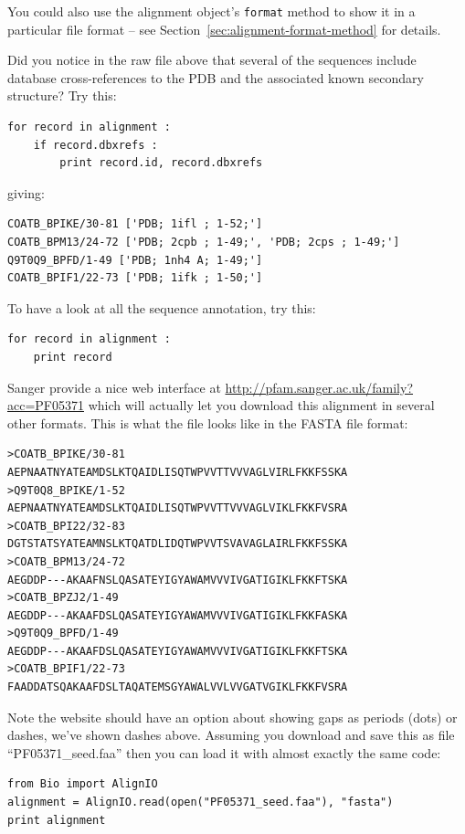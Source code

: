 \documentclass{report}
\begin{document}
You could also use the alignment object's \verb|format| method to show it in a particular file format  -- see Section~\ref{sec:alignment-format-method} for details.

Did you notice in the raw file above that several of the sequences include database cross-references to the PDB and the associated known secondary structure?  Try this:

\begin{verbatim}
for record in alignment :
    if record.dbxrefs :
        print record.id, record.dbxrefs
\end{verbatim}

\noindent giving:

\begin{verbatim}
COATB_BPIKE/30-81 ['PDB; 1ifl ; 1-52;']
COATB_BPM13/24-72 ['PDB; 2cpb ; 1-49;', 'PDB; 2cps ; 1-49;']
Q9T0Q9_BPFD/1-49 ['PDB; 1nh4 A; 1-49;']
COATB_BPIF1/22-73 ['PDB; 1ifk ; 1-50;']
\end{verbatim}

\noindent To have a look at all the sequence annotation, try this:

\begin{verbatim}
for record in alignment :
    print record
\end{verbatim}

Sanger provide a nice web interface at \url{http://pfam.sanger.ac.uk/family?acc=PF05371} which will actually let you download this alignment in several other formats.  This is what the file looks like in the FASTA file format:

\begin{verbatim}
>COATB_BPIKE/30-81
AEPNAATNYATEAMDSLKTQAIDLISQTWPVVTTVVVAGLVIRLFKKFSSKA
>Q9T0Q8_BPIKE/1-52
AEPNAATNYATEAMDSLKTQAIDLISQTWPVVTTVVVAGLVIKLFKKFVSRA
>COATB_BPI22/32-83
DGTSTATSYATEAMNSLKTQATDLIDQTWPVVTSVAVAGLAIRLFKKFSSKA
>COATB_BPM13/24-72
AEGDDP---AKAAFNSLQASATEYIGYAWAMVVVIVGATIGIKLFKKFTSKA
>COATB_BPZJ2/1-49
AEGDDP---AKAAFDSLQASATEYIGYAWAMVVVIVGATIGIKLFKKFASKA
>Q9T0Q9_BPFD/1-49
AEGDDP---AKAAFDSLQASATEYIGYAWAMVVVIVGATIGIKLFKKFTSKA
>COATB_BPIF1/22-73
FAADDATSQAKAAFDSLTAQATEMSGYAWALVVLVVGATVGIKLFKKFVSRA
\end{verbatim}

\noindent Note the website should have an option about showing gaps as periods (dots) or dashes, we've shown dashes above.  Assuming you download and save this as file ``PF05371\_seed.faa'' then you can load it with almost exactly the same code:

\begin{verbatim}
from Bio import AlignIO
alignment = AlignIO.read(open("PF05371_seed.faa"), "fasta")
print alignment
\end{verbatim}
\end{document}
